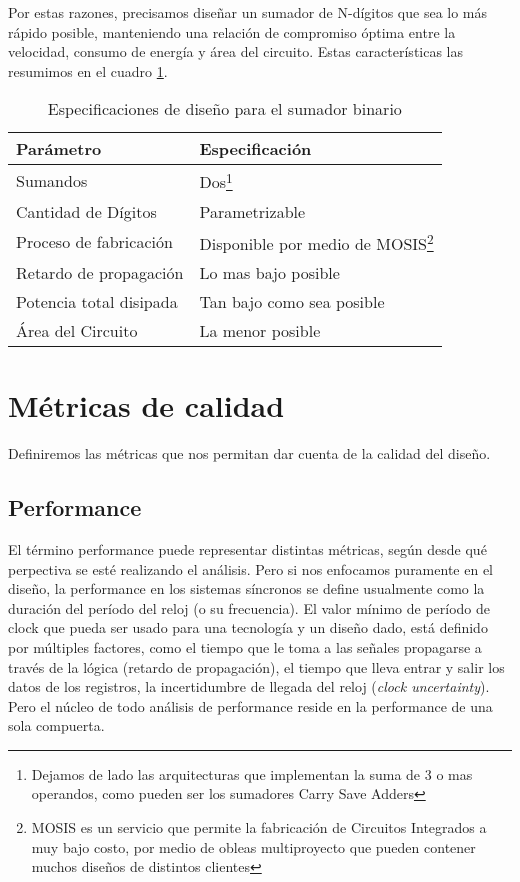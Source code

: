 Por estas razones, precisamos diseñar un sumador de N-dígitos que sea lo más rápido posible, manteniendo una relación de compromiso óptima entre la velocidad, consumo de energía y área del circuito.
Estas características las resumimos en el cuadro \ref{cuadro:especifaciones}.
\begin{savenotes}
\begin{table}[h]
\centering
\begin{tabular}{@{}ll@{}}
\toprule
\textbf{Parámetro}  & \textbf{Especificación} \\ \midrule
Sumandos & Dos\footnote{Dejamos de lado las arquitecturas que implementan la suma de 3 o mas operandos, como pueden ser los sumadores Carry Save Adders} \\	
Cantidad de Dígitos & Parametrizable \\
Proceso de fabricación  & Disponible por medio de MOSIS\footnote{MOSIS es un servicio que permite la fabricación de Circuitos Integrados a muy bajo costo, por medio de obleas multiproyecto que pueden contener muchos diseños de distintos clientes} \\ 
Retardo de propagación  & Lo mas bajo posible                 \\
Potencia total disipada & Tan bajo como sea posible                 \\
Área del Circuito       & La menor posible                \\ \bottomrule
\end{tabular}
\caption{Especificaciones de diseño para el sumador binario}
\label{cuadro:especifaciones}
\end{table}
\end{savenotes}


\section{Métricas de calidad}
Definiremos las métricas que nos permitan dar cuenta de la calidad del diseño.
\subsection{Performance}

El término performance puede representar distintas métricas, según desde qué perpectiva se esté realizando el análisis. Pero si nos enfocamos puramente en el diseño, la performance en los sistemas síncronos se define usualmente\cite{rabaey2003} como la duración del período del reloj (o su frecuencia). El valor mínimo de período de clock que pueda ser usado para una tecnología y un diseño dado, está definido por múltiples factores, como el tiempo que le toma a las señales propagarse a través de la lógica (retardo de propagación), el tiempo que lleva entrar y salir los datos de los registros, la incertidumbre de llegada del reloj (\emph{clock uncertainty}). Pero el núcleo de todo análisis de performance reside en la performance de una sola compuerta.

